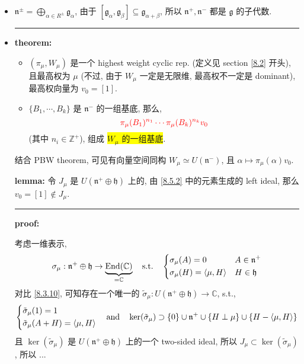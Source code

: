 \begin{itemize}
	\item $\mathfrak{n}^\pm = \bigoplus_{\alpha \in R^\pm} \mathfrak{g}_\alpha$, 由于 $[\mathfrak{g}_\alpha, \mathfrak{g}_\beta] \subseteq \mathfrak{g}_{\alpha + \beta}$, 所以 $\mathfrak{n}^+, \mathfrak{n}^-$ 都是 $\mathfrak{g}$ 的子代数.
	
	\noindent\rule[0.5ex]{\linewidth}{0.5pt} %
	
	\item \textbf{theorem:}
	\begin{itemize}
		\item $(\pi_\mu, W_\mu)$ 是一个 highest weight cyclic rep. (定义见 section \ref{8.2} 开头), 且最高权为 $\mu$ (不过, 由于 $W_\mu$ 一定是无限维, 最高权不一定是 dominant), 最高权向量为 $v_0 = [1]$.
		
		\item $\{B_1, \cdots, B_k\}$ 是 $\mathfrak{n}^-$ 的一组基底, 那么,
		\begin{equation} \label{8.5.7}
			\mathcolor{red}{\pi_\mu(B_1)^{n_1} \cdots \pi_\mu(B_k)^{n_k} v_0}
		\end{equation}
		(其中 $n_i \in \mathbb{Z}^+$), 组成 \colorbox{yellow}{$W_\mu$ 的一组基底}.
	\end{itemize}
	结合 PBW theorem, 可见有向量空间同构 $W_\mu \simeq U(\mathfrak{n}^-)$, 且 $\alpha \mapsto \pi_\mu(\alpha) v_0$.
	
	\begin{tcolorbox}[title=proof:]
		\textbf{lemma:} 令 $J_\mu$ 是 $U(\mathfrak{n}^+ \oplus \mathfrak{h})$ 上的, 由 \eqref{8.5.2} 中的元素生成的 left ideal, 那么 $v_0 = [1] \notin J_\mu$.
		
		\noindent\rule[0.5ex]{\linewidth}{0.5pt} %
		
		\textbf{proof:}
		
		考虑一维表示,
		\begin{equation}
			\sigma_\mu : \mathfrak{n}^+ \oplus \mathfrak{h} \rightarrow \underbrace{\mathrm{End}(\mathbb{C})}_{= \mathbb{C}} \quad \text{s.t.} \quad \begin{dcases}
				\sigma_\mu(A) = 0 & A \in \mathfrak{n}^+ \\
				\sigma_\mu(H) = \braket{\mu, H} & H \in \mathfrak{h}
			\end{dcases}
		\end{equation}
		对比 \eqref{8.3.10}, 可知存在一个唯一的 $\tilde{\sigma}_\mu : U(\mathfrak{n}^+ \oplus \mathfrak{h}) \rightarrow \mathbb{C}$, s.t.,
		\begin{equation}
			\begin{dcases}
				\tilde{\sigma}_\mu(1) = 1 \\
				\tilde{\sigma}_\mu(A + H) = \braket{\mu, H}
			\end{dcases} \quad \text{and} \quad \ker(\tilde{\sigma}_\mu) \supset \{0\} \cup \mathfrak{n}^+ \cup \{H \perp \mu\} \cup \{H - \braket{\mu, H}\}
		\end{equation}
		且 $\ker(\tilde{\sigma}_\mu)$ 是 $U(\mathfrak{n}^+ \oplus \mathfrak{h})$ 上的一个 two-sided ideal, 所以 $J_\mu \subset \ker(\tilde{\sigma}_\mu)$, 所以 ...
		

\end{tcolorbox}
\end{itemize}
